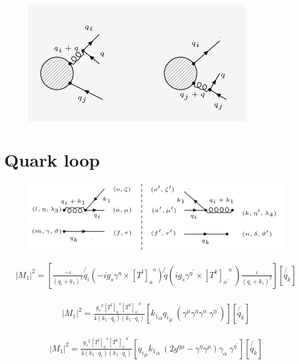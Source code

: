 
\begin{figure}[ht!]
\centering
\includegraphics[width=0.85\textwidth]{images/QG/QGDiagrams.png}
\end{figure}
\pagebreak

\section{Quark loop}
\begin{figure}[ht!]
\centering
\includegraphics[scale=0.7]{images/QG/M1Squer.png}
\end{figure}

\begin{equation}
\begin{split}
|M_1|^2=[\frac{-i}{(q_i +k_1)^2}\not{q_i}(-ig_s {\gamma}^{\eta}\times{[T^l]_a}^o)\not{q}(ig_s {\gamma}^{{\eta}^{\prime}}\times{[T^k]_{o^{\prime}}}^{a^{\prime}})\frac{i}{(q_i +k_1)^2}][\not{q_k}]
\end{split}
\end{equation}


\begin{equation}
\begin{split}
|M_1|^2=\frac{{g_s}^2 {[T^l]_a}^o {[T^k]_{o^{\prime}}}^{a^{\prime}}}{4(k_1 \cdot q_i)(k_1 \cdot q_i)}[ {k_1}_{\alpha} {q_i}_{\mu}\:(\gamma^{\mu}{\gamma}^{\eta}\gamma^{\alpha}\: {\gamma}^{{\eta}^{\prime}})][\not{q_k}]
\end{split}
\end{equation}


\begin{equation}
\begin{split}
|M_1|^2=\frac{{g_s}^2 {[T^l]_a}^o {[T^k]_{o^{\prime}}}^{a^{\prime}}}{4(k_1 \cdot q_i)(k_1 \cdot q_i)}[{q_i}_{\mu}{k_1}_{\alpha}\:(2g^{{\eta}{\mu}}-{\gamma}^{\eta}\gamma^{\mu})\gamma_{\alpha}\: {\gamma}^{{\eta}^{\prime}}][\not{q_k}]
\end{split}
\end{equation}

